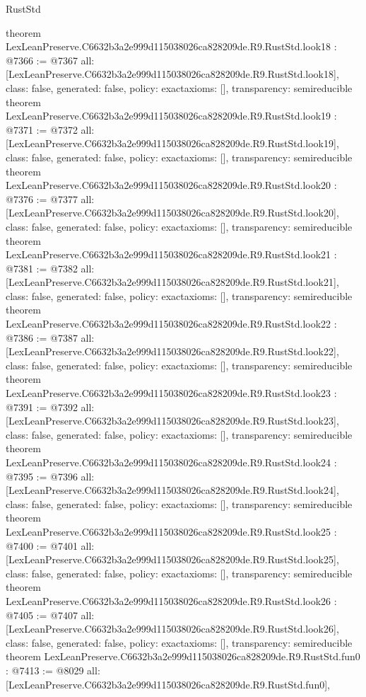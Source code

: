 \begin{lexlean}{RustStd}
\begin{coremodule}
{}
theorem LexLeanPreserve.C6632b3a2e999d115038026ca828209de.R9.RustStd.look18 : @7366 := @7367 {
  all: [LexLeanPreserve.C6632b3a2e999d115038026ca828209de.R9.RustStd.look18],
  class: false,
  generated: false,
  policy: exact{axioms: []},
  transparency: semireducible
}
theorem LexLeanPreserve.C6632b3a2e999d115038026ca828209de.R9.RustStd.look19 : @7371 := @7372 {
  all: [LexLeanPreserve.C6632b3a2e999d115038026ca828209de.R9.RustStd.look19],
  class: false,
  generated: false,
  policy: exact{axioms: []},
  transparency: semireducible
}
theorem LexLeanPreserve.C6632b3a2e999d115038026ca828209de.R9.RustStd.look20 : @7376 := @7377 {
  all: [LexLeanPreserve.C6632b3a2e999d115038026ca828209de.R9.RustStd.look20],
  class: false,
  generated: false,
  policy: exact{axioms: []},
  transparency: semireducible
}
theorem LexLeanPreserve.C6632b3a2e999d115038026ca828209de.R9.RustStd.look21 : @7381 := @7382 {
  all: [LexLeanPreserve.C6632b3a2e999d115038026ca828209de.R9.RustStd.look21],
  class: false,
  generated: false,
  policy: exact{axioms: []},
  transparency: semireducible
}
theorem LexLeanPreserve.C6632b3a2e999d115038026ca828209de.R9.RustStd.look22 : @7386 := @7387 {
  all: [LexLeanPreserve.C6632b3a2e999d115038026ca828209de.R9.RustStd.look22],
  class: false,
  generated: false,
  policy: exact{axioms: []},
  transparency: semireducible
}
theorem LexLeanPreserve.C6632b3a2e999d115038026ca828209de.R9.RustStd.look23 : @7391 := @7392 {
  all: [LexLeanPreserve.C6632b3a2e999d115038026ca828209de.R9.RustStd.look23],
  class: false,
  generated: false,
  policy: exact{axioms: []},
  transparency: semireducible
}
theorem LexLeanPreserve.C6632b3a2e999d115038026ca828209de.R9.RustStd.look24 : @7395 := @7396 {
  all: [LexLeanPreserve.C6632b3a2e999d115038026ca828209de.R9.RustStd.look24],
  class: false,
  generated: false,
  policy: exact{axioms: []},
  transparency: semireducible
}
theorem LexLeanPreserve.C6632b3a2e999d115038026ca828209de.R9.RustStd.look25 : @7400 := @7401 {
  all: [LexLeanPreserve.C6632b3a2e999d115038026ca828209de.R9.RustStd.look25],
  class: false,
  generated: false,
  policy: exact{axioms: []},
  transparency: semireducible
}
theorem LexLeanPreserve.C6632b3a2e999d115038026ca828209de.R9.RustStd.look26 : @7405 := @7407 {
  all: [LexLeanPreserve.C6632b3a2e999d115038026ca828209de.R9.RustStd.look26],
  class: false,
  generated: false,
  policy: exact{axioms: []},
  transparency: semireducible
}
theorem LexLeanPreserve.C6632b3a2e999d115038026ca828209de.R9.RustStd.fun0 : @7413 := @8029 {
  all: [LexLeanPreserve.C6632b3a2e999d115038026ca828209de.R9.RustStd.fun0],
}
\end{coremodule}
\end{lexlean}

